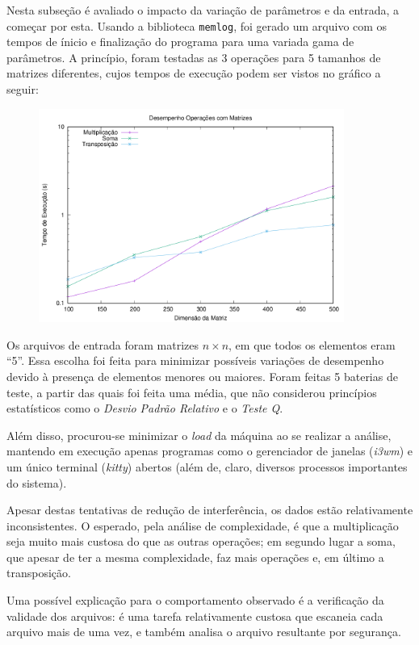 \documentclass{article}
\def\code#1{\texttt{#1}}
\begin{document}
Nesta subseção é avaliado o impacto da variação de parâmetros e da entrada, a começar por esta. Usando a biblioteca \code{memlog}, foi gerado um arquivo com os tempos de ínicio e finalização do programa para uma variada gama de parâmetros. A princípio, foram testadas as 3 operações para 5 tamanhos de matrizes diferentes, cujos tempos de execução podem ser vistos no gráfico a seguir:

\begin{figure} [H]
    \includegraphics[width=10cm]{params-perf.png} 
    \centering
\end{figure}

Os arquivos de entrada foram matrizes \( n \times n \), em que todos os elementos eram ``5''. Essa escolha foi feita para minimizar possíveis variações de desempenho devido à presença de elementos menores ou maiores. Foram feitas 5 baterias de teste, a partir das quais foi feita uma média, que não considerou princípios estatísticos como o \textit{Desvio Padrão Relativo} e o \textit{Teste Q}.

Além disso, procurou-se minimizar o \textit{load} da máquina ao se realizar a análise, mantendo em execução apenas programas como o gerenciador de janelas (\textit{i3wm}) e um único terminal (\textit{kitty}) abertos (além de, claro, diversos processos importantes do sistema).

Apesar destas tentativas de redução de interferência, os dados estão relativamente inconsistentes. O esperado, pela análise de complexidade, é que a multiplicação seja muito mais custosa do que as outras operações; em segundo lugar a soma, que apesar de ter a mesma complexidade, faz mais operações e, em último a transposição.

Uma possível explicação para o comportamento observado é a verificação da validade dos arquivos: é uma tarefa relativamente custosa que escaneia cada arquivo mais de uma vez, e também analisa o arquivo resultante por segurança.
\end{document}
